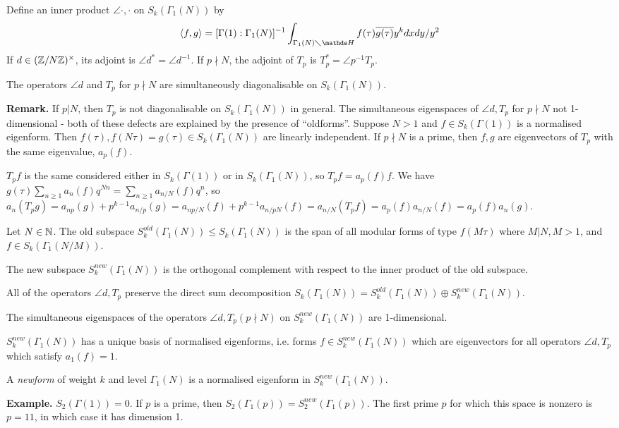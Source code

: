 \documentclass[10pt,a4paper]{article}
\begin{document}
\begin{proposition}
  Define an inner product $\angle{\cdot,\cdot}$ on $S_k(\Gamma_1(N))$ by
  \[\angle{f,g} = [\Gamma(1):\Gamma_1(N)]^{-1}\int_{\Gamma_1(N)\diagdown \H}f(\tau)\overline{g(\tau)}y^{k}dxdy/y^2\]
  If $d \in (\mathbb{Z}/N\mathbb{Z})^\times$, its adjoint is $\angle{d}^\ast = \angle{d^{-1}}$. If $p \nmid N$, the adjoint of $T_p$ is $T_p^\ast = \angle{p^{-1}}T_p$.
\end{proposition}
\begin{corollary}
  The operators $\angle{d}$ and $T_p$ for $p \nmid N$ are simultaneously diagonalisable on $S_k(\Gamma_1(N))$.
\end{corollary}
\textbf{Remark.} If $p |N$, then $T_p$ is not diagonalisable on $S_k(\Gamma_1(N))$ in general. The simultaneous eigenspaces of $\angle{d}, T_p$ for $p \nmid N$ not 1-dimensional - both of these defects are explained by the presence of ``oldforms''. Suppose $N >1$ and $f \in S_k(\Gamma(1))$ is a normalised eigenform. Then $f(\tau), f(N\tau) = g(\tau) \in S_k(\Gamma_1(N))$ are linearly independent. If $p \nmid N$ is a prime, then $f, g$ are eigenvectors of $T_p$ with the same eigenvalue, $a_p(f)$.

$T_p f$ is the same considered either in $S_k(\Gamma(1))$ or in $S_k(\Gamma_1(N))$, so $T_p f = a_p(f)f$. We have $g(\tau)  \sum_{n\geq 1}a_n(f)q^{Nn} = \sum_{n\geq 1}a_{n/N}(f)q^n$, so $a_n(T_p g) = a_{np}(g) + p^{k-1}a_{n/p}(g) = a_{np/N}(f) + p^{k-1}a_{n/pN}(f) = a_{n/N}(T_p f) = a_p(f)a_{n/N}(f) = a_p(f)a_n(g)$.

\begin{definition}
  Let $N \in \mathbb{N}$. The old subspace $S^{old}_k(\Gamma_1(N)) \leq S_k(\Gamma_1(N))$ is the span of all modular forms of type $f(M\tau)$ where $M | N, M> 1$, and $f \in S_k(\Gamma_1(N/M))$.

  The new subspace $S^{new}_k(\Gamma_1(N))$ is the orthogonal complement with respect to the inner product of the old subspace.
\end{definition}
\begin{theorem}
  All of the operators $\angle{d}, T_p$ preserve the direct sum decomposition $S_k(\Gamma_1(N)) = S_k^{old}(\Gamma_1(N)) \oplus S_k^{new}(\Gamma_1(N))$.

  The simultaneous eigenspaces of the operators $\angle{d}, T_p (p \nmid N)$ on $S_k^{new}(\Gamma_1(N))$ are 1-dimensional.

  $S_k^{new}(\Gamma_1(N))$ has a unique basis of normalised eigenforms, i.e. forms $f \in S_k^{new}(\Gamma_1(N))$ which are eigenvectors for all operators $\angle{d}, T_p$ which satisfy $a_1(f) = 1$.
\end{theorem}
\begin{definition}
  A \emph{newform} of weight $k$ and level $\Gamma_1(N)$ is a normalised eigenform in $S_k^{new}(\Gamma_1(N))$.
\end{definition}
\textbf{Example.} $S_2(\Gamma(1)) = 0$. If $p$ is a prime, then $S_2(\Gamma_1(p)) = S_2^{new}(\Gamma_1(p))$. The first prime $p$ for which this space is nonzero is $p=11$, in which case it has dimension 1.
\end{document}
